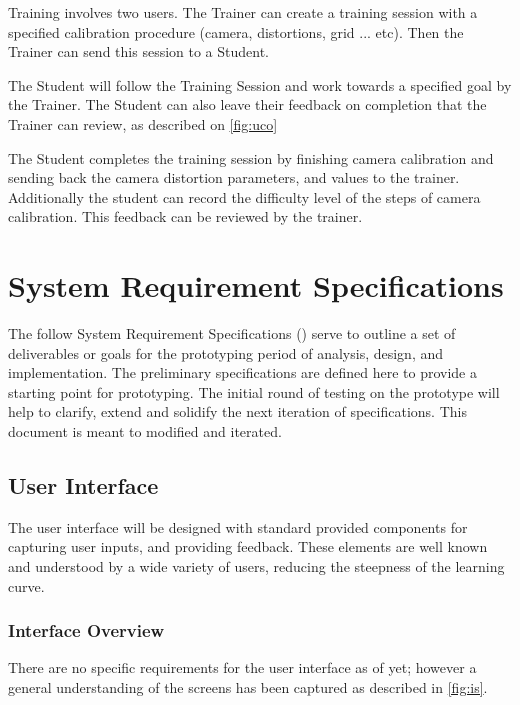 \documentclass[11pt]{report}
\begin{document}
Training involves two users. The Trainer can create a training session with a specified calibration procedure (camera, distortions, grid ... etc). Then the Trainer can send this session to a Student. 

The Student will follow the Training Session and work towards a specified goal by the Trainer. The Student can also leave their feedback on completion that the Trainer can review, as described on \ref{fig:uco}

The Student completes the training session by finishing camera calibration and sending back the camera distortion parameters,  and  values to the trainer. Additionally the student can record the difficulty level of the steps of camera calibration. This feedback can be reviewed by the trainer.  


\chapter{System Requirement Specifications}



The follow System Requirement Specifications () serve to outline a set of deliverables or goals for the prototyping period of analysis, design, and implementation. The preliminary specifications are defined here to provide a starting point for prototyping. The initial round of testing on the prototype will help to clarify, extend and solidify the next iteration of specifications. This document is meant to modified and iterated.  

\section{User Interface} 

The user interface will be designed with standard  provided components for capturing user inputs, and providing feedback. These elements are well known and understood by a wide variety of users, reducing the steepness of the learning curve.

\subsection{Interface Overview}

There are no specific requirements for the user interface as of yet; however a general understanding of the screens has been captured as described in \ref{fig:is}. 
\end{document}
